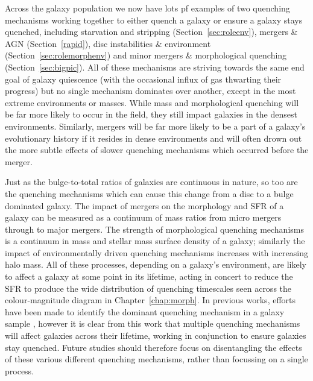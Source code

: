 Across the galaxy population we now have lots pf examples of two quenching mechanisms working together to either quench a galaxy or ensure a galaxy stays quenched, including starvation and stripping (Section~\ref{sec:roleenv}), mergers \& AGN (Section~\ref{rapid}), disc instabilities \&  environment (Section~\ref{sec:rolemorphenv}) and minor mergers \& morphological quenching (Section~\ref{sec:bigpic}). All of these mechanisms are striving towards the same end goal of galaxy quiescence (with the occasional influx of gas thwarting their progress) but no single mechanism dominates over another, except in the most extreme environments or masses. While mass and morphological quenching will be far more likely to occur in the field, they still impact galaxies in the densest environments. Similarly, mergers will be far more likely to be a part of a galaxy's evolutionary history if it resides in dense environments and will often drown out the more subtle effects of slower quenching mechanisms which occurred before the merger. %

Just as the bulge-to-total ratios of galaxies are continuous in nature, so too are the quenching mechanisms which can cause this change from a disc to a bulge dominated galaxy. The impact of mergers on the morphology and SFR of a galaxy can be measured as a continuum of mass ratios from micro mergers \citep{carlin16} through to major mergers. The strength of morphological quenching mechanisms is a continuum in mass and stellar mass surface density of a galaxy; similarly the impact of environmentally driven quenching mechanisms increases with increasing halo mass. All of these processes, depending on a galaxy's environment, are likely to affect a galaxy at some point in its lifetime, acting in concert to reduce the SFR to produce the wide distribution of quenching timescales seen across the colour-magnitude diagram in Chapter~\ref{chap:morph}. In previous works, efforts have been made to identify the dominant quenching mechanism in a galaxy sample \citep{citebomb}, however it is clear from this work that multiple quenching mechanisms will affect galaxies across their lifetime, working in conjunction to ensure galaxies stay quenched. Future studies should therefore focus on disentangling the effects of these various different quenching mechanisms, rather than focussing on a single process. 


